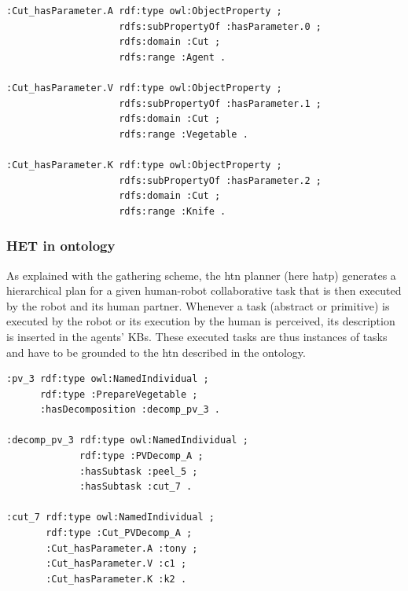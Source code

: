 \begin{lstlisting}[frame=single, basicstyle=\scriptsize\ttfamily, label={lst:chap6_owl_params}, caption={Description of the \textit{hasParameter} property specifications for the parameters (resp. the agent performing the task, the cut vegetable, and the used knife) of the \textit{Cut} primitive task in the OWL language using the Turle syntax.},captionpos=b, style=OwlTurtle]
:Cut_hasParameter.A rdf:type owl:ObjectProperty ;
                    rdfs:subPropertyOf :hasParameter.0 ;
                    rdfs:domain :Cut ;
                    rdfs:range :Agent .

:Cut_hasParameter.V rdf:type owl:ObjectProperty ;
                    rdfs:subPropertyOf :hasParameter.1 ;
                    rdfs:domain :Cut ;
                    rdfs:range :Vegetable .

:Cut_hasParameter.K rdf:type owl:ObjectProperty ;
                    rdfs:subPropertyOf :hasParameter.2 ;
                    rdfs:domain :Cut ;
                    rdfs:range :Knife .
\end{lstlisting}

\subsubsection{HET in ontology}

As explained with the gathering scheme, the \acrshort{htn} planner (here \acrshort{hatp}) generates a hierarchical plan for a given human-robot collaborative task that is then executed by the robot and its human partner. Whenever a task (abstract or primitive) is executed by the robot or its execution by the human is perceived, its description is inserted in the agents' KBs. These executed tasks are thus instances of tasks and have to be grounded to the \acrshort{htn} described in the ontology.

\begin{lstlisting}[frame=single, basicstyle=\scriptsize\ttfamily, label={lst:chap6_owl_plan}, caption={A partial description of the initiation of a decomposition of a PrepareVegetable task and its primitive Cut task resulting from a plan and linked to the description of the domain. Description is provided in the OWL language using the Turle syntax.},captionpos=b, style=OwlTurtle_indiv]
:pv_3 rdf:type owl:NamedIndividual ;
      rdf:type :PrepareVegetable ;
      :hasDecomposition :decomp_pv_3 .

:decomp_pv_3 rdf:type owl:NamedIndividual ;
             rdf:type :PVDecomp_A ;
             :hasSubtask :peel_5 ;
             :hasSubtask :cut_7 .

:cut_7 rdf:type owl:NamedIndividual ;
       rdf:type :Cut_PVDecomp_A ;
       :Cut_hasParameter.A :tony ;
       :Cut_hasParameter.V :c1 ;
       :Cut_hasParameter.K :k2 .
\end{lstlisting}

